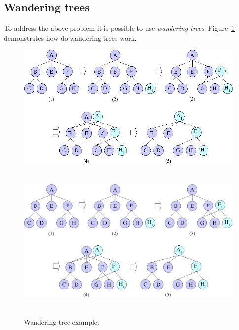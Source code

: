 %
%
\subsection{Wandering trees} \label{ref_SectionWandTrees}

To address the above problem it is possible to use \emph{wandering trees}.
Figure~\ref{ref_FigureWandtree} demonstrates how do wandering trees work.

%
%
\begin{figure}[h]
\begin{center}
\begin{htmlonly}
\includegraphics{pics/wandtree.png}
\end{htmlonly}
\includegraphics[width=159mm,height=80mm]{pics/wandtree.pdf}
\end{center}
\caption{Wandering tree example.}
\label{ref_FigureWandtree}
\end{figure}

